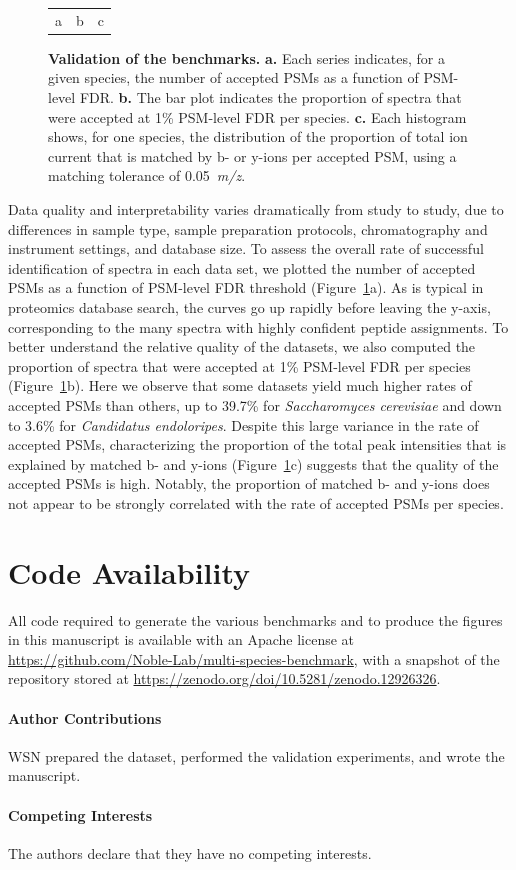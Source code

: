 \documentclass{article}
\begin{document}
\begin{figure}
\begin{tabular}{lll}
    a & b & c \\
  \end{tabular}
  \caption{\textbf{Validation of the benchmarks.}
    \textbf{a.} Each series indicates, for a given species, the number of accepted PSMs as a function of PSM-level FDR.
    \textbf{b.} The bar plot indicates the proportion of spectra that were accepted at 1\% PSM-level FDR per species.
    \textbf{c.} Each histogram shows, for one species, the distribution of the proportion of total ion current that is matched by b- or y-ions per accepted PSM, using a matching tolerance of 0.05~\textit{m/z}.}
  \label{fig:fdr}
\end{figure}

Data quality and interpretability varies dramatically from study to study, due to differences in sample type, sample preparation protocols, chromatography and instrument settings, and database size.
To assess the overall rate of successful identification of spectra in each data set, we plotted the number of accepted PSMs as a function of PSM-level FDR threshold (Figure~\ref{fig:fdr}a).
As is typical in proteomics database search, the curves go up rapidly before leaving the y-axis, corresponding to the many spectra with highly confident peptide assignments.
To better understand the relative quality of the datasets, we also computed the proportion of spectra that were accepted at 1\% PSM-level FDR per species (Figure~\ref{fig:fdr}b).
Here we observe that some datasets yield much higher rates of accepted PSMs than others, up to 39.7\% for \textit{Saccharomyces cerevisiae} and down to 3.6\% for \textit{Candidatus endoloripes}.
Despite this large variance in the rate of accepted PSMs, characterizing the proportion of the total peak intensities that is explained by matched b- and y-ions (Figure~\ref{fig:fdr}c) suggests that the quality of the accepted PSMs is high.
Notably, the proportion of matched  b- and y-ions does not appear to be strongly correlated with the rate of accepted PSMs per species.

\section*{Code Availability}
All code required to generate the various benchmarks and to produce the figures in this manuscript is available with an Apache license at \url{https://github.com/Noble-Lab/multi-species-benchmark}, with a snapshot of the repository stored at \url{https://zenodo.org/doi/10.5281/zenodo.12926326}.



\paragraph{Author Contributions}
WSN prepared the dataset, performed the validation experiments, and wrote the manuscript.

\paragraph{Competing Interests}
The authors declare that they have no competing interests.
  
\end{document}
